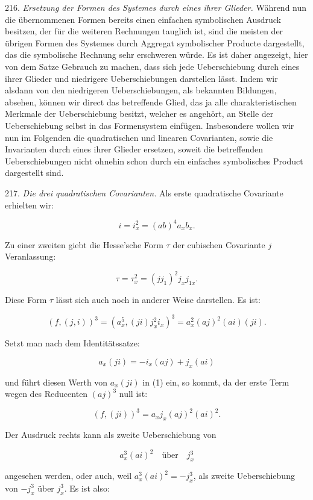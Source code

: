 \documentclass[11pt]{article}
\providecommand{\weberpage}[1]{}
\providecommand{\weq}[2]{\begin{equation}\tag{#1}#2\end{equation}}
\begin{document}
216. \textit{Ersetzung der Formen des Systemes durch eines ihrer Glieder.}
Während nun die übernommenen Formen bereits einen einfachen symbolischen
 Ausdruck besitzen, der für die weiteren Rechnungen tauglich
 ist, sind die meisten der übrigen Formen des Systemes durch
Aggregat symbolischer Producte dargestellt, das die symbolische Rechnung
 sehr erschweren würde. Es ist daher angezeigt, hier von dem
Satze Gebrauch zu machen, dass sich jede Ueberschiebung durch eines
ihrer Glieder und niedrigere Ueberschiebungen darstellen lässt. Indem
wir alsdann von den niedrigeren Ueberschiebungen, als bekannten
Bildungen, absehen, können wir direct das betreffende Glied, das ja
alle charakteristischen Merkmale der Ueberschiebung besitzt, welcher
es angehört, an Stelle der Ueberschiebung selbst in das Formensystem
einfügen. Insbesondere wollen wir nun im Folgenden die quadratischen
und linearen Covarianten, sowie die Invarianten durch eines ihrer
Glieder ersetzen, soweit die betreffenden Ueberschiebungen nicht ohnehin
 schon durch ein einfaches symbolisches Product dargestellt sind.

217. \textit{Die drei quadratischen Covarianten.} Als erste quadratische
Covariante erhielten wir:

\[ i = i_x^2 = (ab)^4 a_x b_x. \]

Zu einer zweiten giebt die Hesse'sche Form $\tau$ der cubischen Covariante
$j$ Veranlassung:

\[ \tau = \tau_x^2 = (j j_1)^2 j_x j_{1x}. \]

Diese Form $\tau$ lässt sich auch noch in anderer Weise darstellen. Es ist:

\weq{1}{(f, (j, i))^3 = (a_x^5, (ji) j_x^2 i_x)^3 = a_x^2 (aj)^2 (ai) (ji).}


\weberpage{244}

Setzt man nach dem Identitätssatze:

\weq{2}{a_x (ji) = -i_x (aj) + j_x (ai)}

und führt diesen Werth von $a_x (ji)$ in (1) ein, so kommt, da der
erste Term wegen des Reducenten $(aj)^3$ null ist:

\[ (f, (ji))^3 = a_x j_x (aj)^2 (ai)^2. \]

Der Ausdruck rechts kann als zweite Ueberschiebung von

\[ a_x^3 (ai)^2 \quad \text{über} \quad j_x^3 \]

angesehen werden, oder auch, weil $a_x^3 (ai)^2 = -j_x^3$, als zweite Ueberschiebung
 von $-j_x^3$ über $j_x^3$. Es ist also:
\end{document}
